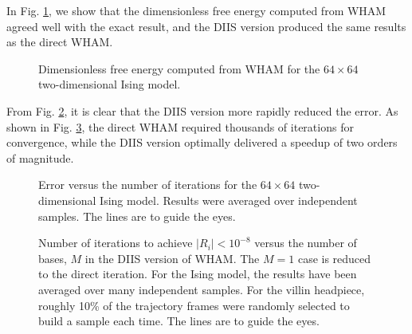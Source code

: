 \documentclass[reprint,superscriptaddress]{revtex4-1}
\begin{document}
In Fig. \ref{fig:zref},
we show that
the dimensionless free energy computed from WHAM
agreed well with the exact result\cite{
  ferdinand1969},
and the DIIS version produced the same results
as the direct WHAM.



\begin{figure}[h]
  \caption{
    \label{fig:zref}
    Dimensionless free energy computed from WHAM
    for the $64\times64$ two-dimensional Ising model.
  }
\end{figure}




From Fig. \ref{fig:trace},
it is clear that the DIIS version more rapidly
reduced the error.
%
As shown in Fig. \ref{fig:niter},
the direct WHAM
required thousands of iterations for convergence,
while the DIIS version optimally
delivered a speedup of two orders of magnitude.






\begin{figure}[h]
  \caption{
    \label{fig:trace}
    Error versus the number of iterations
    for the $64\times64$ two-dimensional Ising model.
    Results were averaged over independent samples.
    The lines are to guide the eyes.
  }
\end{figure}







\begin{figure}[h]
  \caption{
    \label{fig:niter}
    Number of iterations to achieve $|R_i| < 10^{-8}$
    versus the number of bases, $M$
    in the DIIS version of WHAM.
    The $M = 1$ case is reduced to the direct iteration.
    For the Ising model,
    the results have been averaged over many independent samples.
    For the villin headpiece,
    roughly 10\% of the trajectory frames
    were randomly selected to build a sample each time.
    The lines are to guide the eyes.
  }
\end{figure}
\end{document}
